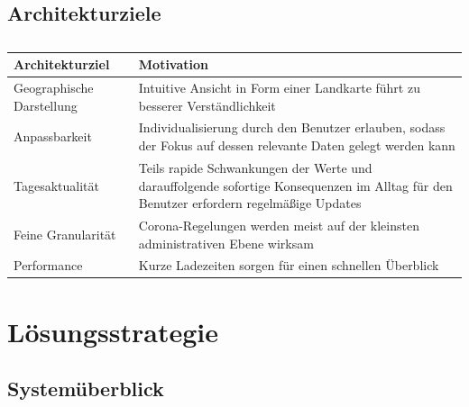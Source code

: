 \documentclass[conference]{IEEEtran}
\begin{document}
\subsection{Architekturziele}%
%
\begin{table}[h!]%
    \centering%
    \caption{}%
    \label{tab:architekturziele}%
    \def\arraystretch{1.5}%
    \begin{tabular*}{\columnwidth}{@{ }p{}@{ }p{}}%
        \textbf{Architekturziel} & \textbf{Motivation}\\
        \hline
        \hline
        Geographische Darstellung & Intuitive Ansicht in Form einer Landkarte führt zu besserer Verständlichkeit\\
        \hline
        Anpassbarkeit & Individualisierung durch den Benutzer erlauben, sodass der Fokus auf dessen relevante Daten gelegt werden kann\\
        \hline
        Tagesaktualität & Teils rapide Schwankungen der Werte und darauffolgende sofortige Konsequenzen im Alltag für den Benutzer erfordern regelmäßige Updates\\
        \hline
        Feine Granularität & Corona-Regelungen werden meist auf der kleinsten administrativen Ebene wirksam\\
        \hline
        Performance & Kurze Ladezeiten sorgen für einen schnellen Überblick\\
    \end{tabular*}
\end{table}






\section{Lösungsstrategie}

\subsection{Systemüberblick}
\end{document}
